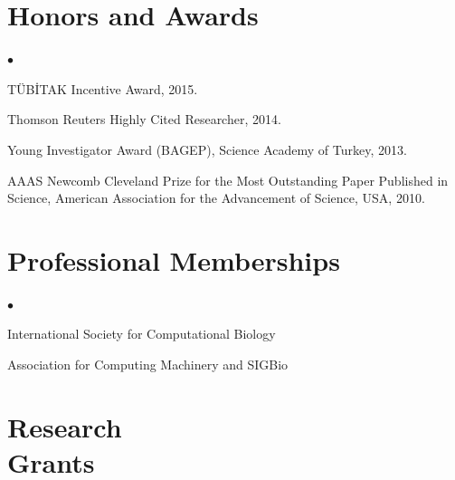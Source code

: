 \documentclass[margin,line]{res}
\newenvironment{list2}{
  \begin{list}{$\bullet$}{%
      \setlength{\itemsep}{0in}
      \setlength{\parsep}{0in} \setlength{\parskip}{0in}
      \setlength{\topsep}{0in} \setlength{\partopsep}{0in} 
      \setlength{\leftmargin}{0.2in}}}{\end{list}}
\newcommand{\junk}[1]{}
\begin{document}
\begin{resume}
          \section{\sc Honors and Awards} 
          \begin{list2}
            \junk{
            \item
              Ranked 36$^{th}$ among 1.2 million examinees in the Nationwide University
              Entrance Examinations in ~Turkey, 1996.
            \item
              Ranked 40$^{th}$ in the Nationwide Post-Graduate Education Examination in Turkey, 1999.
            }
          \item
            TÜBİTAK Incentive Award, 2015.
          \item
            Thomson Reuters Highly Cited Researcher, 2014.
          \item
            Young Investigator Award (BAGEP), Science Academy of Turkey, 2013.
          \item
            AAAS Newcomb Cleveland Prize for the Most Outstanding Paper Published in Science, American Association for the Advancement of Science, USA, 2010.
          \end{list2}
          

\vspace*{-.2cm}
\section{\sc Professional Memberships}
\begin{list2}
\item 
  International Society for Computational Biology%
\item
  Association for Computing Machinery and SIGBio
\end{list2}

\clearpage

          \section{\sc Research \\ Grants}
                                       \vspace{-0.4cm}

\end{resume}
\end{document}
